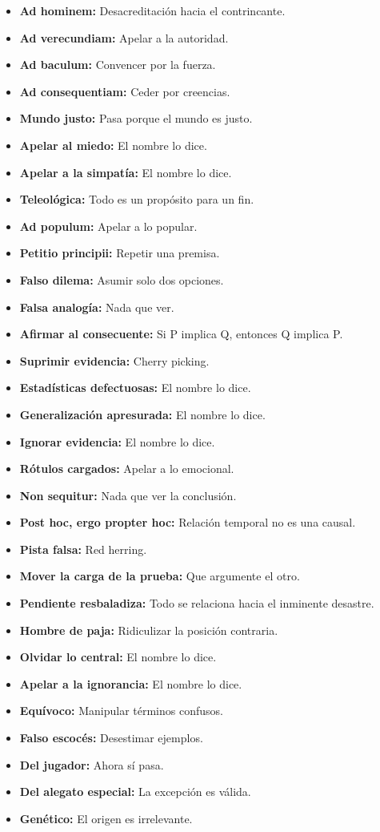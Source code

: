 \begin{itemize}
  \item{\textbf{Ad hominem:} Desacreditación hacia el
        contrincante.}
  \item{\textbf{Ad verecundiam:} Apelar a la autoridad.}
  \item{\textbf{Ad baculum:} Convencer por la fuerza.}
  \item{\textbf{Ad consequentiam: } Ceder por creencias.}
  \item{\textbf{Mundo justo:} Pasa porque el mundo es justo.}
  \item{\textbf{Apelar al miedo:} El nombre lo dice.}
  \item{\textbf{Apelar a la simpatía:} El nombre lo dice.}
  \item{\textbf{Teleológica:} Todo es un propósito para un
        fin.}
  \item{\textbf{Ad populum:} Apelar a lo popular.}
  \item{\textbf{Petitio principii:} Repetir una premisa.}
  \item{\textbf{Falso dilema:} Asumir solo dos opciones.}
  \item{\textbf{Falsa analogía:} Nada que ver.}
  \item{\textbf{Afirmar al consecuente: } Si P implica Q,
        entonces Q implica P.}
  \item{\textbf{Suprimir evidencia:} Cherry picking.}
  \item{\textbf{Estadísticas defectuosas:} El nombre lo
        dice.}
  \item{\textbf{Generalización apresurada: }El nombre lo
        dice.}
  \item{\textbf{Ignorar evidencia: }El nombre lo dice.}
  \item{\textbf{Rótulos cargados: }Apelar a lo emocional.}
  \item{\textbf{Non sequitur: }Nada que ver la conclusión.}
  \item{\textbf{Post hoc, ergo propter hoc: }Relación
        temporal no es una causal.}
  \item{\textbf{Pista falsa: }Red herring.}
  \item{\textbf{Mover la carga de la prueba: }Que argumente
        el otro.}
  \item{\textbf{Pendiente resbaladiza: }Todo se relaciona
        hacia el inminente desastre.}
  \item{\textbf{Hombre de paja: }Ridiculizar la posición
        contraria.}
  \item{\textbf{Olvidar lo central: }El nombre lo dice.}
  \item{\textbf{Apelar a la ignorancia: }El nombre lo dice.}
  \item{\textbf{Equívoco:} Manipular términos confusos.}
  \item{\textbf{Falso escocés: }Desestimar ejemplos.}
  \item{\textbf{Del jugador: }Ahora sí pasa.}
  \item{\textbf{Del alegato especial: }La excepción es válida.}
  \item{\textbf{Genético: }El origen es irrelevante.}
\end{itemize}
